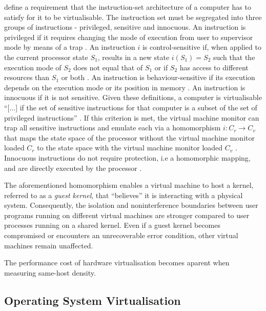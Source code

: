 \textcite{10.1145/361011.361073} define a requirement that the instruction-set architecture of a computer
has to satisfy for it to be virtualisable. The instruction set must be segregated into three groups of
instructions - privileged, sensitive and innocuous. An instruction is privileged if it requires changing
the mode of execution from user to supervisor mode by means of a trap \cite{10.1145/361011.361073}. 
An instruction $i$ is control-sensitive if, when applied to the current processor state $S_1$, results
in a new state $i(S_{1}) = S_{2}$ such that the execution mode of $S_{2}$ does not equal that of $S_{1}$
or if $S_{2}$ has access to different resources than $S_1$ or both \cite{10.1145/361011.361073}. 
An instruction is behaviour-sensitive if its execution depends on the execution mode or its position
in memory \cite{10.1145/361011.361073}. An instruction is innocuous if it is not sensitive. 
Given these definitions, a computer is virtualisable \enquote{[...] if the set of sensitive instructions
for that computer is a subset of the set of privileged instructions} \cite[6]{10.1145/361011.361073}.
If this criterion is met, the virtual machine monitor can trap all sensitive instructions and emulate 
each via a homomorphism $i: C_{r} \rightarrow C_{v}$ that maps the state space of the processor without
the virtual machine monitor loaded $C_{r}$ to the state space with the virtual machine monitor loaded 
$C_{v}$ \cite{10.1145/361011.361073}. Innocuous instructions do not require protection, i.e a homomorphic
mapping, and are directly executed by the processor \cite{10.1145/361011.361073}.

The aforementioned homomorphism enables a virtual machine to host a kernel, referred to as a \textit{guest kernel}, that 
\enquote{believes} it is interacting with a physical system.
Consequently, the isolation and noninterference boundaries between user programs 
running on different virtual machines are stronger compared to user processes running on a shared kernel. 
Even if a guest kernel becomes compromised or encounters an unrecoverable error condition, 
other virtual machines remain unaffected.

The performance cost of hardware virtualisation becomes aparent when measuring same-host density. 
\subsection{Operating System Virtualisation}
\label{ch:fundamentals/virtualisation/os-virtualisation}

